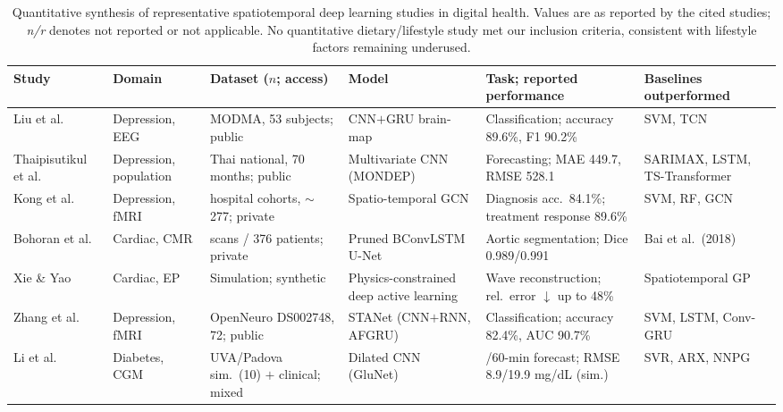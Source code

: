 \documentclass[journal]{IEEEtran}
\begin{document}
\begin{table}[t]
\centering
\caption{Quantitative synthesis of representative spatiotemporal deep learning studies in digital health. Values are as reported by the cited studies; \emph{n/r} denotes not reported or not applicable. No quantitative dietary/lifestyle study met our inclusion criteria, consistent with lifestyle factors remaining underused.}
\label{tab:evidence}
\scriptsize
\setlength{\tabcolsep}{3pt}
\renewcommand{\arraystretch}{1.15}
\begin{tabularx}{\textwidth}{>{\raggedright\arraybackslash}p{1.7cm} >{\raggedright\arraybackslash}p{1.5cm} >{\raggedright\arraybackslash}p{2.9cm} >{\raggedright\arraybackslash}p{2.6cm} >{\raggedright\arraybackslash}X >{\raggedright\arraybackslash}p{2.5cm}}
\toprule
\textbf{Study} & \textbf{Domain} & \textbf{Dataset ($n$; access)} & \textbf{Model} & \textbf{Task; reported performance} & \textbf{Baselines outperformed} \\
\midrule
Liu et al.~\cite{2} & Depression, EEG & MODMA, 53 subjects; public & CNN$+$GRU brain-map & Classification; accuracy 89.6\%, F1 90.2\% & SVM, TCN \\
\addlinespace[1pt]
Thaipisutikul et al.~\cite{3} & Depression, population & Thai national, 70 months; public & Multivariate CNN (MONDEP) & Forecasting; MAE 449.7, RMSE 528.1 & SARIMAX, LSTM, TS-Transformer \\
\addlinespace[1pt]
Kong et al.~\cite{4} & Depression, fMRI & 2 hospital cohorts, $\sim$277; private & Spatio-temporal GCN & Diagnosis acc.\ 84.1\%; treatment response 89.6\% & SVM, RF, GCN \\
\addlinespace[1pt]
Bohoran et al.~\cite{5} & Cardiac, CMR & 424 scans / 376 patients; private & Pruned BConvLSTM U-Net & Aortic segmentation; Dice 0.989/0.991 & Bai et al.\ (2018) \\
\addlinespace[1pt]
Xie \& Yao~\cite{7} & Cardiac, EP & Simulation; synthetic & Physics-constrained deep active learning & Wave reconstruction; rel.\ error $\downarrow$ up to 48\% & Spatiotemporal GP \\
\addlinespace[1pt]
Zhang et al.~\cite{9} & Depression, fMRI & OpenNeuro DS002748, 72; public & STANet (CNN$+$RNN, AFGRU) & Classification; accuracy 82.4\%, AUC 90.7\% & SVM, LSTM, Conv-GRU \\
\addlinespace[1pt]
Li et al.~\cite{Li2020GluNet} & Diabetes, CGM & UVA/Padova sim.\ (10) $+$ clinical; mixed & Dilated CNN (GluNet) & 30/60-min forecast; RMSE 8.9/19.9 mg/dL (sim.) & SVR, ARX, NNPG \\

\end{tabularx}
\end{table}
\end{document}
